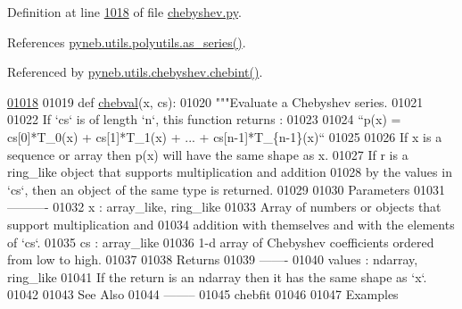 Definition at line \hyperlink{chebyshev_8py_source_l01018}{1018} of file \hyperlink{chebyshev_8py_source}{chebyshev.\-py}.



References \hyperlink{polyutils_8py_source_l00115}{pyneb.\-utils.\-polyutils.\-as\-\_\-series()}.



Referenced by \hyperlink{chebyshev_8py_source_l00912}{pyneb.\-utils.\-chebyshev.\-chebint()}.


\begin{DoxyCode}
\hypertarget{namespacepyneb_1_1utils_1_1chebyshev_l01018}{}\hyperlink{namespacepyneb_1_1utils_1_1chebyshev_a44ae40c5b4cbdc3a230c014c834f5ce6}{01018} 
01019 \textcolor{keyword}{def }\hyperlink{namespacepyneb_1_1utils_1_1chebyshev_a44ae40c5b4cbdc3a230c014c834f5ce6}{chebval}(x, cs):
01020     \textcolor{stringliteral}{"""Evaluate a Chebyshev series.}
01021 \textcolor{stringliteral}{}
01022 \textcolor{stringliteral}{    If `cs` is of length `n`, this function returns :}
01023 \textcolor{stringliteral}{}
01024 \textcolor{stringliteral}{    ``p(x) = cs[0]*T\_0(x) + cs[1]*T\_1(x) + ... + cs[n-1]*T\_\{n-1\}(x)``}
01025 \textcolor{stringliteral}{}
01026 \textcolor{stringliteral}{    If x is a sequence or array then p(x) will have the same shape as x.}
01027 \textcolor{stringliteral}{    If r is a ring\_like object that supports multiplication and addition}
01028 \textcolor{stringliteral}{    by the values in `cs`, then an object of the same type is returned.}
01029 \textcolor{stringliteral}{}
01030 \textcolor{stringliteral}{    Parameters}
01031 \textcolor{stringliteral}{    ----------}
01032 \textcolor{stringliteral}{    x : array\_like, ring\_like}
01033 \textcolor{stringliteral}{        Array of numbers or objects that support multiplication and}
01034 \textcolor{stringliteral}{        addition with themselves and with the elements of `cs`.}
01035 \textcolor{stringliteral}{    cs : array\_like}
01036 \textcolor{stringliteral}{        1-d array of Chebyshev coefficients ordered from low to high.}
01037 \textcolor{stringliteral}{}
01038 \textcolor{stringliteral}{    Returns}
01039 \textcolor{stringliteral}{    -------}
01040 \textcolor{stringliteral}{    values : ndarray, ring\_like}
01041 \textcolor{stringliteral}{        If the return is an ndarray then it has the same shape as `x`.}
01042 \textcolor{stringliteral}{}
01043 \textcolor{stringliteral}{    See Also}
01044 \textcolor{stringliteral}{    --------}
01045 \textcolor{stringliteral}{    chebfit}
01046 \textcolor{stringliteral}{}
01047 \textcolor{stringliteral}{    Examples}

\end{DoxyCode}
